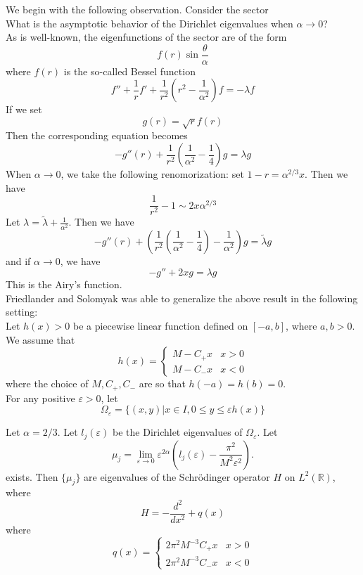 We begin with the following observation. Consider the sector
\\%
What is the asymptotic behavior of the Dirichlet eigenvalues when
$\alpha\rightarrow 0$?
\\

As is well-known, the eigenfunctions of the sector are of the form
\[
f(r)\sin\frac{\theta}{\alpha}
\]
where $f(r)$ is the so-called Bessel function
\[
f'' + \frac{1}{r}f' + \frac{1}{r^2}(r^2 - \frac{1}{\alpha^2})f = -\lambda f
\]
If we set
\[
g(r) = \sqrt{r} f(r)
\]
Then the corresponding equation becomes
\[
-g''(r) + \frac{1}{r^2}(\frac{1}{\alpha^2}-\frac{1}{4})g = \lambda g
\]
When $\alpha\rightarrow 0$, we take the following renomorization:
set $1 - r = \alpha^{2/3}x$. Then we have
\[
\frac{1}{r^2} - 1 \sim 2x\alpha^{2/3}
\]
Let $\lambda = \widetilde\lambda + \frac{1}{\alpha^2}$. Then we have
\[
-g''(r) + \left(\frac{1}{r^2}\left(\frac{1}{\alpha^2}-\frac{1}{4}\right)-
\frac{1}{\alpha^2}\right)g
= \widetilde\lambda g
\]
and if $\alpha\rightarrow 0$, we have
\[
-g'' + 2xg = \lambda g
\]
This is the Airy's function.
\\

Friedlander and Solomyak was able to generalize the above result in the 
following setting:
\\

Let $h(x) > 0$ be a piecewise linear function defined on $[-a, b]$, where
$a, b > 0$. We assume that
\[
h(x) = \left\{
\begin{array}{ll}
M-C_+x & x > 0 \\
M-C_-x & x < 0
\end{array}
\right.
\]
where the choice of $M, C_+, C_-$ are so that $h(-a) = h(b) = 0$.
\\

For any positive $\varepsilon > 0$, let
\[
\Omega_\varepsilon = \{(x,y)|x\in I, 0\leqslant y \leqslant \varepsilon h(x)\}
\]
\begin{theorem}
 Let $\alpha = 2/3$. Let $l_j(\varepsilon)$ be the
Dirichlet eigenvalues of $\Omega_\varepsilon$. Let
\[
\mu_j = \lim_{\varepsilon\rightarrow 0}
\varepsilon^{2\alpha}
\left(l_j(\varepsilon) - \frac{\pi^2}{M^2\varepsilon^2}\right).
\]
exists. Then $\{\mu_j\}$ are eigenvalues of the Schr\"{o}dinger operator $H$ on
$L^2(\mathbb{R})$, where
\[
H = -\frac{d^2}{dx^2} + q(x)
\]
where
\[
q(x) = \left\{
\begin{array}{ll}
2\pi^2 M^{-3} C_+x & x > 0 \\
2\pi^2 M^{-3} C_-x & x < 0
\end{array}
\right.
\]
\end{theorem}

